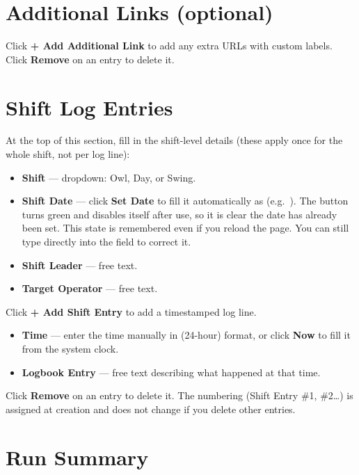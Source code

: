 \section{Additional Links (optional)}

Click \textbf{+ Add Additional Link} to add any extra URLs with custom labels.
Click \textbf{Remove} on an entry to delete it.

\section{Shift Log Entries}

At the top of this section, fill in the shift-level details (these apply once
for the whole shift, not per log line):

\begin{itemize}
    \item \textbf{Shift} --- dropdown: Owl, Day, or Swing.
    \item \textbf{Shift Date} --- click \textbf{Set Date} to fill it
          automatically as  (e.g.\
          ). The button turns green and disables itself
          after use, so it is clear the date has already been set. This state
          is remembered even if you reload the page. You can still type
          directly into the field to correct it.
    \item \textbf{Shift Leader} --- free text.
    \item \textbf{Target Operator} --- free text.
\end{itemize}

Click \textbf{+ Add Shift Entry} to add a timestamped log line.

\begin{itemize}
    \item \textbf{Time} --- enter the time manually in  (24-hour)
          format, or click \textbf{Now} to fill it from the system clock.
    \item \textbf{Logbook Entry} --- free text describing what happened at that
          time.
\end{itemize}

Click \textbf{Remove} on an entry to delete it. The numbering
(Shift Entry \#1, \#2\ldots) is assigned at creation and does not change if
you delete other entries.

\section{Run Summary}

